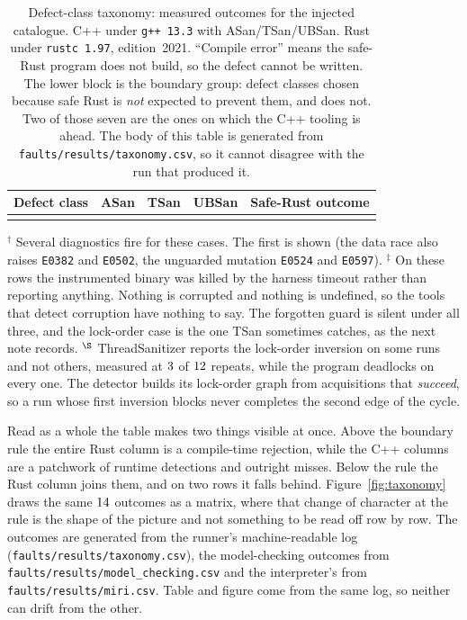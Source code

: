 \documentclass[english,oneside,a4paper,censored,csm,software-track-2020]{HYthesisML}
\begin{document}
\begin{table}[H]
\centering
\small
\caption[Defect-class taxonomy: measured outcomes]{Defect-class taxonomy: measured outcomes for the injected catalogue. C++ under
\texttt{g++~13.3} with ASan/TSan/UBSan. Rust under \texttt{rustc~1.97}, edition~2021. ``Compile
error'' means the safe-Rust program does not build, so the defect cannot be written. The lower
block is the boundary group: defect classes chosen because safe Rust is \emph{not} expected to
prevent them, and does not. Two of those seven are the ones on which the C++ tooling is ahead.
The body of this table is generated from \texttt{faults/results/taxonomy.csv}, so it cannot
disagree with the run that produced it.\label{tab:taxonomy}}
\footnotesize
\setlength{\tabcolsep}{4pt}
\begin{tabular}{@{}l l l l l@{}}
\hline\hline
Defect class & ASan & TSan & UBSan & Safe-Rust outcome \\
\hline
\\
\hline
\end{tabular}

\vspace{0.4em}
{\footnotesize\raggedright
$^{\dagger}$ Several diagnostics fire for these cases. The first is shown (the data race also
raises \texttt{E0382} and \texttt{E0502}, the unguarded mutation \texttt{E0524} and
\texttt{E0597}). \quad
$^{\ddagger}$ On these rows the instrumented binary was killed by the harness timeout rather
than reporting anything. Nothing is corrupted and nothing is undefined, so the tools that
detect corruption have nothing to say. The forgotten guard is silent under all three, and the
lock-order case is the one TSan sometimes catches, as the next note records. \quad
$^{\S}$ ThreadSanitizer reports the lock-order inversion on some runs and not others, measured at
$3$ of $12$ repeats, while the program deadlocks on
every one. The detector builds its lock-order graph from acquisitions that \emph{succeed}, so a
run whose first inversion blocks never completes the second edge of the cycle.\par}
\end{table}

Read as a whole the table makes two things visible at once. Above the boundary rule the entire
Rust column is a compile-time rejection, while the C++ columns are a patchwork of runtime
detections and outright misses. Below the rule the Rust column joins them, and on two rows it
falls behind. Figure~\ref{fig:taxonomy} draws the same $14$ outcomes as a matrix,
where that
change of character at the rule is the shape of the picture and not something to be read off
row by row. The outcomes are generated from the runner's machine-readable log
(\texttt{faults/results/taxonomy.csv}), the model-checking outcomes from
\texttt{faults/results/model\_checking.csv} and the interpreter's from
\texttt{faults/results/miri.csv}. Table and figure come from the same log, so neither
can drift from the other.
\end{document}

